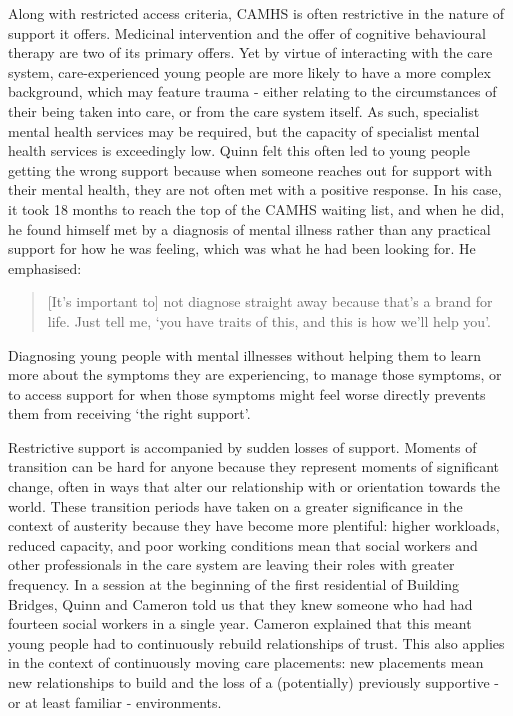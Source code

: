 Along with restricted access criteria, CAMHS is often restrictive in the nature of support it offers. Medicinal intervention and the offer of cognitive behavioural therapy are two of its primary offers. Yet by virtue of interacting with the care system, care-experienced young people are more likely to have a more complex background, which may feature trauma - either relating to the circumstances of their being taken into care, or from the care system itself. As such, specialist mental health services may be required, but the capacity of specialist mental health services is exceedingly low. Quinn felt this often led to young people getting the wrong support because when someone reaches out for support with their mental health, they are not often met with a positive response. In his case, it took 18 months to reach the top of the CAMHS waiting list, and when he did, he found himself met by a diagnosis of mental illness rather than any practical support for how he was feeling, which was what he had been looking for. He emphasised:
\begin{quote}
[It’s important to] not diagnose straight away because that's a brand for life. Just tell me, `you have traits of this, and this is how we'll help you'.
\end{quote}
Diagnosing young people with mental illnesses without helping them to learn more about the symptoms they are experiencing, to manage those symptoms, or to access support for when those symptoms might feel worse directly prevents them from receiving ‘the right support’.

Restrictive support is accompanied by sudden losses of support. Moments of transition can be hard for anyone because they represent moments of significant change, often in ways that alter our relationship with or orientation towards the world. These transition periods have taken on a greater significance in the context of austerity because they have become more plentiful: higher workloads, reduced capacity, and poor working conditions mean that social workers and other professionals in the care system are leaving their roles with greater frequency. In a session at the beginning of the first residential of Building Bridges, Quinn and Cameron told us that they knew someone who had had fourteen social workers in a single year. Cameron explained that this meant young people had to continuously rebuild relationships of trust. This also applies in the context of continuously moving care placements: new placements mean new relationships to build and the loss of a (potentially) previously supportive - or at least familiar - environments.

